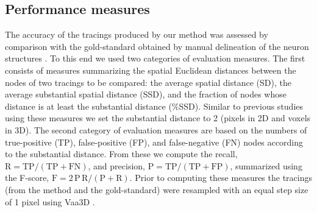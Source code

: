 \subsection{Performance measures}
\label{subsec:performance-measures}
The accuracy of the tracings produced by our method was assessed by comparison with the gold-standard obtained by manual delineation of the neuron structures \citep{gillette2011diademchallenge, Meijering-2004}. To this end we used two categories of evaluation measures. The first consists of measures summarizing the spatial Euclidean distances between the nodes of two tracings to be compared: the average spatial distance (SD), the average substantial spatial distance (SSD), and the fraction of nodes whose distance is at least the substantial distance (\%SSD). Similar to previous studies using these measures \citep{peng2010v3d} we set the substantial distance to 2 (pixels in 2D and voxels in 3D). The second category of evaluation measures are based on the numbers of true-positive (TP), false-positive (FP), and false-negative (FN) nodes according to the substantial distance. From these we compute the recall, $\textrm{R}=\textrm{TP}/(\textrm{TP}+\textrm{FN})$, and precision, $\textrm{P}=\textrm{TP}/(\textrm{TP}+\textrm{FP})$, summarized using the F-score, $\textrm{F}=2\,\textrm{P}\,\textrm{R}/(\textrm{P}+\textrm{R})$. Prior to computing these measures the tracings (from the method and the gold-standard) were resampled with an equal step size of 1 pixel using Vaa3D \citep{peng2010v3d}.

